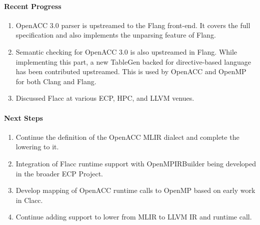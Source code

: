 \paragraph{Recent Progress}

\begin{enumerate}
\item OpenACC 3.0 parser is upstreamed to the Flang front-end. It covers the
      full specification and also implements the unparsing feature of Flang.
\item Semantic checking for OpenACC 3.0 is also upstreamed in Flang. While
      implementing this part, a new TableGen backed for directive-based language
      has been contributed upstreamed. This is used by OpenACC and OpenMP for
      both Clang and Flang.
\item Discussed Flacc at various ECP, HPC, and LLVM venues.
\end{enumerate}


\paragraph{Next Steps}

\begin{enumerate}
\item Continue the definition of the OpenACC MLIR dialect and complete the
      lowering to it.
\item Integration of Flacc runtime support with OpenMPIRBuilder being developed in the broader ECP Project.
\item Develop mapping of OpenACC runtime calls to OpenMP based on early work in Clacc.
\item Continue adding support to lower from MLIR to LLVM IR and runtime call.
\end{enumerate}
